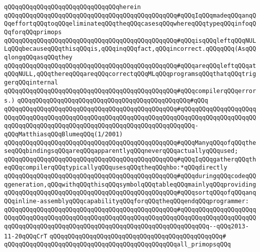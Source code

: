 \newline
\verb|qQQqqQQqqQQqqQQqqQQqqQQqqQQqqQQqherein|\newline
\newline
\verb|qQQqqQQqqQQqqQQqqQQqqQQqqQQqqQQqqQQqqQQqqQQqqQQq#qQQqIqQQqmadeqQQqanqQQqeffortqQQqtoqQQqeliminateqQQqtheqQQqcasesqQQqwhereqQQqtypeqQQqinfoqQQqforqQQqprimops|\newline
\verb|qQQqqQQqqQQqqQQqqQQqqQQqqQQqqQQqqQQqqQQqqQQqqQQq#qQQqisqQQqleftqQQqNULLqQQqbecauseqQQqthisqQQqis,qQQqinqQQqfact,qQQqincorrect.qQQqqQQq(AsqQQqlongqQQqasqQQqthey|\newline
\verb|qQQqqQQqqQQqqQQqqQQqqQQqqQQqqQQqqQQqqQQqqQQqqQQq#qQQqareqQQqleftqQQqatqQQqNULL,qQQqthereqQQqareqQQqcorrectqQQqMLqQQqprogramsqQQqthatqQQqtriggerqQQqinternal|\newline
\verb|qQQqqQQqqQQqqQQqqQQqqQQqqQQqqQQqqQQqqQQqqQQqqQQq#qQQqcompilerqQQqerrors.)|\newline
\verb|qQQqqQQqqQQqqQQqqQQqqQQqqQQqqQQqqQQqqQQqqQQqqQQq#qQQq|\newline
\verb|qQQqqQQqqQQqqQQqqQQqqQQqqQQqqQQqqQQqqQQqqQQqqQQq#qQQqqQQqqQQqqQQqqQQqqQQqqQQqqQQqqQQqqQQqqQQqqQQqqQQqqQQqqQQqqQQqqQQqqQQqqQQqqQQqqQQqqQQqqQQqqQQqqQQqqQQqqQQqqQQqqQQqqQQqqQQqqQQqqQQqqQQqqQQqqQQq-qQQqMatthiasqQQqBlumeqQQq(1/2001)|\newline
\newline
\newline
\verb|qQQqqQQqqQQqqQQqqQQqqQQqqQQqqQQqqQQqqQQqqQQqqQQq#qQQqManyqQQqofqQQqtheseqQQqbindingsqQQqareqQQqapparentlyqQQqneverqQQqactuallyqQQqused;|\newline
\verb|qQQqqQQqqQQqqQQqqQQqqQQqqQQqqQQqqQQqqQQqqQQqqQQq#qQQqIqQQqgatherqQQqtheqQQqcompilerqQQqtypicallyqQQqusesqQQqtheqQQqhbo:*qQQqdirectly|\newline
\verb|qQQqqQQqqQQqqQQqqQQqqQQqqQQqqQQqqQQqqQQqqQQqqQQq#qQQqduringqQQqcodeqQQqgeneration,qQQqwithqQQqthisqQQqsymbolqQQqtableqQQqmainlyqQQqproviding|\newline
\verb|qQQqqQQqqQQqqQQqqQQqqQQqqQQqqQQqqQQqqQQqqQQqqQQq#qQQqsortqQQqofqQQqanqQQqinline-assemblyqQQqcapabilityqQQqforqQQqtheqQQqendqQQqprogrammer:|\newline
\verb|qQQqqQQqqQQqqQQqqQQqqQQqqQQqqQQqqQQqqQQqqQQqqQQq#qQQqqQQqqQQqqQQqqQQqqQQqqQQqqQQqqQQqqQQqqQQqqQQqqQQqqQQqqQQqqQQqqQQqqQQqqQQqqQQqqQQqqQQqqQQqqQQqqQQqqQQqqQQqqQQqqQQqqQQqqQQqqQQqqQQqqQQqqQQqqQQqqQQq--qQQq2013-11-20qQQqCrT|\newline
\verb|qQQqqQQqqQQqqQQqqQQqqQQqqQQqqQQqqQQqqQQqqQQqqQQq#|\newline
\verb|qQQqqQQqqQQqqQQqqQQqqQQqqQQqqQQqqQQqqQQqqQQqqQQqall_primopsqQQq|\newline
